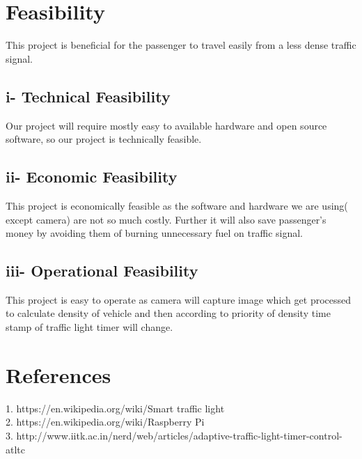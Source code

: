 \documentclass[]{article}
\begin{document}
\pagebreak

\section*{Feasibility}
This project is beneficial for the passenger to travel easily from a less dense traffic signal.


\subsection*{i-   Technical Feasibility}
Our project will require mostly easy to available hardware and open source software, so our project is technically feasible.


\subsection*{ii-  Economic Feasibility}
This project is economically feasible as the software and hardware we are using( except camera) are not so much costly. Further it will also save passenger's money by avoiding them of burning unnecessary fuel on traffic signal.

\subsection*{iii-  Operational Feasibility}
This project is easy to operate as camera will capture image which get processed to calculate density of vehicle and then according to priority of density time stamp of traffic light timer will change.

\section*{References}
1.	https://en.wikipedia.org/wiki/Smart traffic light
\\
2. https://en.wikipedia.org/wiki/Raspberry Pi
\\
3. http://www.iitk.ac.in/nerd/web/articles/adaptive-traffic-light-timer-control-atltc
\end{document}
